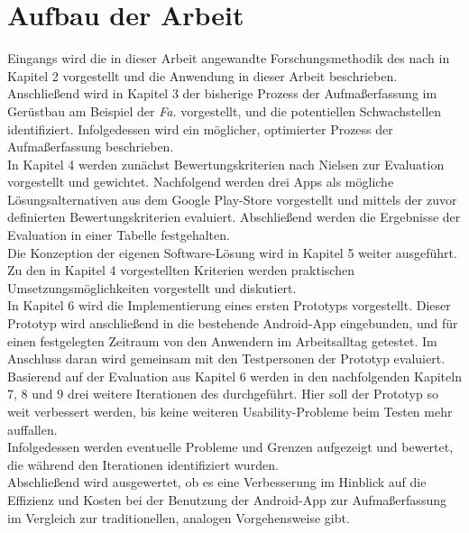 \section{Aufbau der Arbeit}
Eingangs wird die in dieser Arbeit angewandte Forschungsmethodik des \hcdp{} nach \citeauthor{Norman13} in Kapitel 2 vorgestellt und die Anwendung in dieser Arbeit beschrieben. \\

Anschließend wird in Kapitel 3 der bisherige Prozess der Aufmaßerfassung im Gerüstbau am Beispiel der \emph{Fa.} \vr{} vorgestellt, und die potentiellen Schwachstellen identifiziert. 
Infolgedessen wird ein möglicher, optimierter Prozess der Aufmaßerfassung beschrieben. \\

In Kapitel 4 werden zunächst Bewertungskriterien nach Nielsen zur Evaluation vorgestellt und gewichtet.
Nachfolgend werden drei Apps als mögliche Lösungsalternativen aus dem Google Play-Store vorgestellt und mittels der zuvor definierten Bewertungskriterien evaluiert.
Abschließend werden die Ergebnisse der Evaluation in einer Tabelle festgehalten. \\

Die Konzeption der eigenen Software-Lösung wird in Kapitel 5 weiter ausgeführt.
Zu den in Kapitel 4 vorgestellten Kriterien werden praktischen Umsetzungsmöglichkeiten vorgestellt und diskutiert. \\

In Kapitel 6 wird die Implementierung eines ersten Prototyps vorgestellt.
Dieser Prototyp wird anschließend in die bestehende Android-App eingebunden, und für einen festgelegten Zeitraum von den Anwendern im Arbeitsalltag getestet.
Im Anschluss daran wird gemeinsam mit den Testpersonen der Prototyp evaluiert. \\

Basierend auf der Evaluation aus Kapitel 6 werden in den nachfolgenden Kapiteln 7, 8 und 9 drei weitere Iterationen des \hcdp{} durchgeführt.
Hier soll der Prototyp so weit verbessert werden, bis keine weiteren Usability-Probleme beim Testen mehr auffallen. \\

Infolgedessen werden eventuelle Probleme und Grenzen aufgezeigt und bewertet, die während den Iterationen identifiziert wurden. \\

Abschließend wird ausgewertet, ob es eine Verbesserung im Hinblick auf die Effizienz und Kosten bei der Benutzung der Android-App zur Aufmaßerfassung im Vergleich zur traditionellen, analogen Vorgehensweise gibt.

